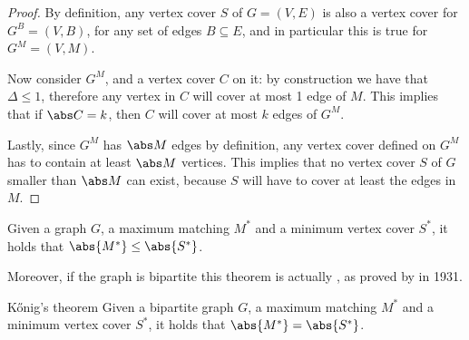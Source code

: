 \documentclass[a4paper, 12pt]{report}
\begin{document}
    \begin{proof}
        By definition, any vertex cover $S$ of $G = (V, E)$ is also a vertex cover for $G^B = (V, B)$, for any set of edges $B \subseteq E$, and in particular this is true for $G^M = (V, M)$.

        Now consider $G^M$, and a vertex cover $C$ on it: by construction we have that $\Delta \le 1$, therefore any vertex in $C$ will cover at most 1 edge of $M$. This implies that if $\abs C = k$, then $C$ will cover at most $k$ edges of $G^M$.

        Lastly, since $G^M$ has $\abs M$ edges by definition, any vertex cover defined on $G^M$ has to contain at least $\abs M$ vertices. This implies that no vertex cover $S$ of $G$ smaller than $\abs M$ can exist, because $S$ will have to cover at least the edges in $M$.
    \end{proof}

    \begin{framedcor}{}
        Given a graph $G$, a maximum matching $M^*$ and a minimum vertex cover $S^*$, it holds that $\abs {M^*} \le \abs {S^*}$.
    \end{framedcor}

    Moreover, if the graph is bipartite this theorem is actually , as proved by \textcite{konig} in 1931.

    \begin{framedthm}[label={konig}]{Kőnig's theorem}
        Given a bipartite graph $G$, a maximum matching $M^*$ and a minimum vertex cover $S^*$, it holds that $\abs {M^*} = \abs {S^*}$.
    \end{framedthm}
\end{document}

